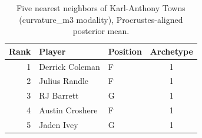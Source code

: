 \begin{table}[htbp]
  \centering\small
  \begin{tabular}{rllc}
    \toprule
    Rank & Player & Position & Archetype \\
    \midrule
    1 & Derrick Coleman & F & 1 \\
    2 & Julius Randle & F & 1 \\
    3 & RJ Barrett & G & 1 \\
    4 & Austin Croshere & F & 1 \\
    5 & Jaden Ivey & G & 1 \\
    \bottomrule
  \end{tabular}
  \caption{Five nearest neighbors of Karl-Anthony Towns (curvature_m3 modality), Procrustes-aligned posterior mean.}
  \label{tab:Karl_Anthony_Towns_neighbors_curvature_m3}
\end{table}

